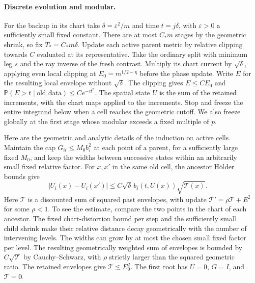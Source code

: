 \documentclass[11pt]{article}
\newcommand{\1}{\mathbf{1}}
\numberwithin{equation}{section}
\begin{document}
\paragraph{Discrete evolution and modular.}
For the backup in its chart take
\(\delta=\varepsilon^2/m\) and time \(t=j\delta\), with
\(\varepsilon>0\) a sufficiently small fixed constant.
There are at most \(C_*\!m\) stages by the geometric shrink,
so fix \(T_*=C_*m\delta\). Update each active parent metric
by relative clipping towards \(C\) evaluated at its
representative. Take the ordinary split with minimum leg \(s\)
and the ray inverse of the fresh contrast.
Multiply its chart current by \(\sqrt\delta\), applying even
local clipping at \(E_0=m^{1/2-\eta}\) before the phase update.
Write \(E\) for the resulting local envelope without
\(\sqrt\delta\). The clipping gives \(E\le CE_0\) and
\(\mathbb P(E>t\mid\text{old data})\le Ce^{-ct^2}\).
The spatial state \(U\) is the sum of the retained increments,
with the chart maps applied to the increments. Stop and
freeze the entire integrand below when a cell reaches the
geometric cutoff. We also freeze globally at the first stage
whose modular exceeds a fixed multiple of \(p\).

Here are the geometric and analytic details of the induction
on active cells. Maintain the cap \(G_{ii}\le M_0 b_i^2\)
at each point of a parent, for a sufficiently large fixed \(M_0\),
and keep the widths between successive states within an
arbitrarily small fixed relative factor.
For \(x,x'\) in the same old cell, the ancestor H\"older
bounds give
\[
 |U_i(x)-U_i(x')|\le C\sqrt\delta\, b_i(t,U(x))\sqrt{\mathcal T(x)}.
 \tag{*}
\]
Here \(\mathcal T\) is a discounted sum of squared past envelopes,
with update \(\mathcal T'=\rho\mathcal T+E^2\) for some
\(\rho<1\). To see the estimate, compare the two points in the
chart of each ancestor. The fixed chart-distortion bound per
step and the sufficiently small child shrink make their
relative distance decay geometrically with the number of
intervening levels. The widths can grow by at most the
chosen small fixed factor per level. The resulting
geometrically weighted sum of envelopes is bounded by
\(C\sqrt{\mathcal T}\) by Cauchy--Schwarz, with \(\rho\)
strictly larger than the squared geometric ratio.
The retained envelopes give \(\mathcal T\lesssim E_0^2\).
The first root has \(U=0\), \(G=I\), and \(\mathcal T=0\).
\end{document}
